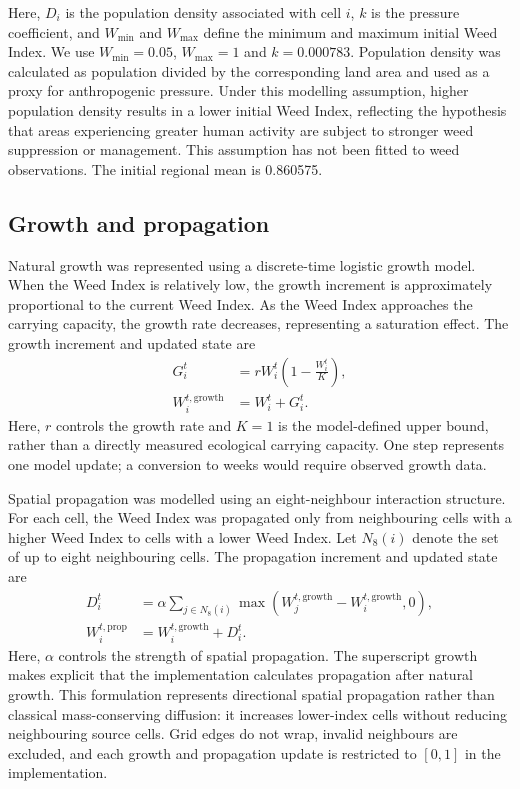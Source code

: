 \documentclass[a4paper,11pt]{article}
\begin{document}
Here, $D_i$ is the population density associated with cell $i$, $k$ is the pressure coefficient, and $W_{\min}$ and $W_{\max}$ define the minimum and maximum initial Weed Index. We use $W_{\min}=0.05$, $W_{\max}=1$ and $k=0.000783$. Population density was calculated as population divided by the corresponding land area and used as a proxy for anthropogenic pressure. Under this modelling assumption, higher population density results in a lower initial Weed Index, reflecting the hypothesis that areas experiencing greater human activity are subject to stronger weed suppression or management. This assumption has not been fitted to weed observations. The initial regional mean is 0.860575.

\subsection{Growth and propagation}

Natural growth was represented using a discrete-time logistic growth model. When the Weed Index is relatively low, the growth increment is approximately proportional to the current Weed Index. As the Weed Index approaches the carrying capacity, the growth rate decreases, representing a saturation effect. The growth increment and updated state are
\begin{align}
G_i^t &= rW_i^t\left(1-\frac{W_i^t}{K}\right),\label{eq:growth}\\
W_i^{t,\mathrm{growth}} &= W_i^t+G_i^t.
\end{align}
Here, $r$ controls the growth rate and $K=1$ is the model-defined upper bound, rather than a directly measured ecological carrying capacity. One step represents one model update; a conversion to weeks would require observed growth data.

Spatial propagation was modelled using an eight-neighbour interaction structure. For each cell, the Weed Index was propagated only from neighbouring cells with a higher Weed Index to cells with a lower Weed Index. Let $N_8(i)$ denote the set of up to eight neighbouring cells. The propagation increment and updated state are
\begin{align}
D_i^t &= \alpha\sum_{j\in N_8(i)}\max\left(W_j^{t,\mathrm{growth}}-W_i^{t,\mathrm{growth}},0\right),\label{eq:spread}\\
W_i^{t,\mathrm{prop}} &= W_i^{t,\mathrm{growth}}+D_i^t.
\end{align}
Here, $\alpha$ controls the strength of spatial propagation. The superscript $\mathrm{growth}$ makes explicit that the implementation calculates propagation after natural growth. This formulation represents directional spatial propagation rather than classical mass-conserving diffusion: it increases lower-index cells without reducing neighbouring source cells. Grid edges do not wrap, invalid neighbours are excluded, and each growth and propagation update is restricted to $[0,1]$ in the implementation.
\end{document}
